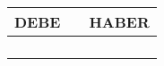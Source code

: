 \begin{table}[H]
    \centering
    \begin{tabular}{|p{3cm}|p{6cm}|p{3cm}|}
    \hline
    \rowcolor{blue!30}
    \textbf{DEBE} & \textbf{} & \textbf{HABER} \\
    \hline
    &  & \\
    \hline
    &  & \\
    \hline
    &  & \\
    \hline
    &  & \\
    \hline
    \end{tabular}
\end{table}
